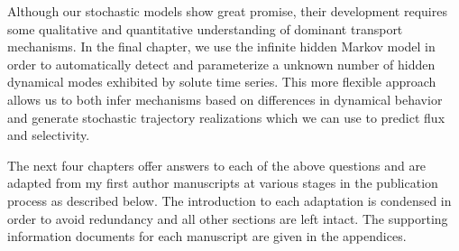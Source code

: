\begin{enumerate}
    	  Although our stochastic models show great promise, their development requires
    	  some qualitative and quantitative understanding of dominant transport
    	  mechanisms. In the final chapter, we use the infinite hidden Markov model in
    	  order to automatically detect and parameterize a unknown number of hidden 
    	  dynamical modes exhibited by solute time series. This more flexible approach
    	  allows us to both infer mechanisms based on differences in dynamical behavior
    	  and generate stochastic trajectory realizations which we can use to predict
    	  flux and selectivity. 
 
  \end{enumerate} 
  
  The next four chapters offer answers to each of the above questions and are adapted from 
  my first author manuscripts at various stages in the publication process as described
  below. The introduction to each adaptation is condensed in order to avoid redundancy and 
  all other sections are left intact. The supporting information documents for each manuscript are
  given in the appendices. \\
  

%
%    
%    
  
